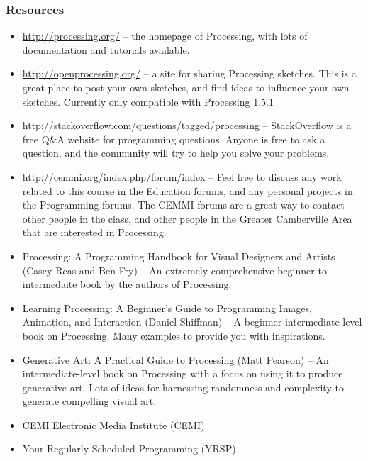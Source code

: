 \subsubsection{Resources}
\begin{itemize}
\item \url{http://processing.org/} -- the homepage of Processing, with lots of documentation and tutorials available.
\item \url{http://openprocessing.org/} -- a site for sharing Processing sketches.  This is a great place to post your own sketches, and find ideas to influence your own sketches.  Currently only compatible with Processing 1.5.1
\item \url{http://stackoverflow.com/questions/tagged/processing} -- StackOverflow is a free Q\&A website for programming questions.  Anyone is free to ask a question, and the community will try to help you solve your problems.
\item \url{http://cemmi.org/index.php/forum/index} -- Feel free to discuss any work related to this course in the Education forums, and any personal projects in the Programming forums.  The CEMMI forums are a great way to contact other people in the class, and other people in the Greater Camberville Area that are interested in Processing.
\end{itemize}

\begin{itemize}
\item Processing: A Programming Handbook for Visual Designers and Artists (Casey Reas and Ben Fry) -- An extremely comprehensive beginner to intermedaite book by the authors of Processing.
\item Learning Processing: A Beginner's Guide to Programming Images, Animation, and Interaction (Daniel Shiffman) -- A beginner-intermediate level book on Processing.  Many examples to provide you with inspirations.
\item Generative Art: A Practical Guide to Processing (Matt Pearson) -- An intermediate-level book on Processing with a focus on using it to produce generative art.  Lots of ideas for harnessing randomness and complexity to generate compelling visual art.
\end{itemize}

\begin{itemize}
\item CEMI Electronic Media Institute (CEMI)
\item Your Regularly Scheduled Programming (YRSP)
\end{itemize}
